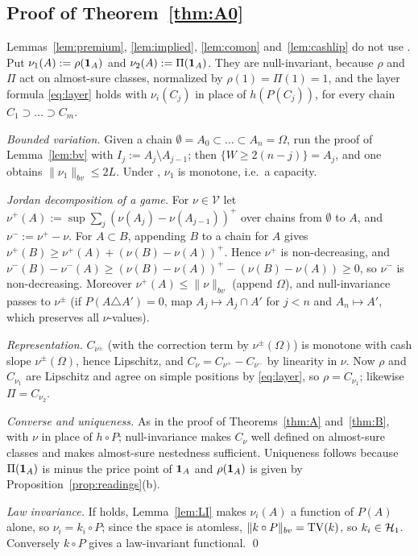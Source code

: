 \subsection{Proof of Theorem~\ref{thm:A0}}\label{app:A0}


Lemmas~\ref{lem:premium}, \ref{lem:implied}, \ref{lem:comon} and~\ref{lem:cashlip} do not use \axLI. Put
$\nu_1(A):=\rho(\mathbf 1_A)$ and $\nu_2(A):=\Pi(\mathbf 1_A)$. They are null-invariant, because $\rho$ and $\Pi$ act on
almost-sure classes, normalized by $\rho(1)=\Pi(1)=1$, and the layer formula \eqref{eq:layer} holds with
$\nu_i(C_j)$ in place of $h(P(C_j))$, for every chain $C_1\supset\dots\supset C_m$.

\emph{Bounded variation.} Given a chain $\emptyset=A_0\subset\dots\subset A_n=\Omega$, run the proof of
Lemma~\ref{lem:bv} with $I_j:=A_j\setminus A_{j-1}$; then $\{W\ge2(n-j)\}=A_j$, and one obtains
$\|\nu_1\|_{bv}\le2L$. Under \axRM, $\nu_1$ is monotone, i.e.\ a capacity.

\emph{Jordan decomposition of a game.} For $\nu\in\mathcal V$ let $\nu^+(A):=\sup\sum_j(\nu(A_j)-\nu(A_{j-1}))^+$
over chains from $\emptyset$ to $A$, and $\nu^-:=\nu^+-\nu$.
For $A\subset B$, appending $B$ to a chain for $A$ gives $\nu^+(B)\ge\nu^+(A)+(\nu(B)-\nu(A))^+$. Hence $\nu^+$ is
non-decreasing, and $\nu^-(B)-\nu^-(A)\ge(\nu(B)-\nu(A))^+-(\nu(B)-\nu(A))\ge0$, so $\nu^-$ is non-decreasing.
Moreover $\nu^+(A)\le\|\nu\|_{bv}$ (append $\Omega$), and null-invariance passes to $\nu^\pm$ (if $P(A\triangle A')=0$,
map $A_j\mapsto A_j\cap A'$ for $j<n$ and $A_n\mapsto A'$, which preserves all $\nu$-values).

\emph{Representation.} $C_{\nu^\pm}$ (with the correction term by $\nu^\pm(\Omega)$) is monotone with cash slope
$\nu^\pm(\Omega)$, hence Lipschitz, and $C_\nu=C_{\nu^+}-C_{\nu^-}$ by linearity in $\nu$. Now $\rho$ and
$C_{\nu_1}$ are Lipschitz and agree on simple positions by \eqref{eq:layer}, so $\rho=C_{\nu_1}$; likewise
$\Pi=C_{\nu_2}$.

\emph{Converse and uniqueness.} As in the proof of Theorems~\ref{thm:A} and~\ref{thm:B}, with $\nu$ in place of
$h\circ P$; null-invariance makes $C_\nu$ well defined on almost-sure classes and makes almost-sure nestedness
sufficient. Uniqueness follows because $\Pi(\mathbf 1_A)$ is minus the price point of $\mathbf 1_A$ and $\rho(\mathbf 1_A)$ is given by
Proposition~\ref{prop:readings}(b).

\emph{Law invariance.} If \axLI{} holds, Lemma~\ref{lem:LI} makes $\nu_i(A)$ a function of $P(A)$ alone, so
$\nu_i=k_i\circ P$; since the space is atomless, $\|k\circ P\|_{bv}=\mathrm{TV}(k)$, so $k_i\in\mathcal H_1$. Conversely
$k\circ P$ gives a law-invariant functional. \qed

